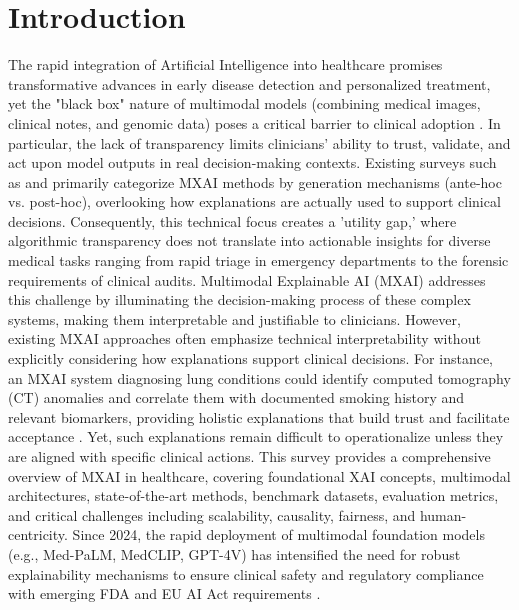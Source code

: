 \documentclass[pdflatex,sn-mathphys-num]{sn-jnl}%
\theoremstyle{thmstyleone}%
\theoremstyle{thmstyletwo}%
\theoremstyle{thmstylethree}%
\begin{document}
\keywords{
Multimodal Explainable AI, Clinical Decision Support, Action-Centered Explainability, Causal Inference }


\maketitle

\section{Introduction}\label{sec1}

The rapid integration of Artificial Intelligence into healthcare promises transformative advances in early disease detection and personalized treatment, yet the "black box" nature of multimodal models (combining medical images, clinical notes, and genomic data) poses a critical barrier to clinical adoption \cite{article}. In particular, the lack of transparency limits clinicians' ability to trust, validate, and act upon model outputs in real decision-making contexts.
Existing surveys such as \cite{rodis2024multimodalexplainableartificialintelligence} and \cite{SADEGHI2024109370} primarily categorize MXAI methods by generation mechanisms (ante-hoc vs. post-hoc), overlooking how explanations are actually used to support clinical decisions. Consequently, this technical focus creates a 'utility gap,' where algorithmic transparency does not translate into actionable insights for diverse medical tasks ranging from rapid triage in emergency departments to the forensic requirements of clinical audits.
Multimodal Explainable AI (MXAI) addresses this challenge by illuminating the decision-making process of these complex systems, making them interpretable and justifiable to clinicians. 
However, existing MXAI approaches often emphasize technical interpretability without explicitly considering how explanations support clinical decisions.
For instance, an MXAI system diagnosing lung conditions could identify computed tomography (CT) anomalies and correlate them with documented smoking history and relevant biomarkers, providing holistic explanations that build trust and facilitate acceptance \cite{Gaube2023,Niu2025}. 
Yet, such explanations remain difficult to operationalize unless they are aligned with specific clinical actions.
This survey provides a comprehensive overview of MXAI in healthcare, covering foundational XAI concepts, multimodal architectures, state-of-the-art methods, benchmark datasets, evaluation metrics, and critical challenges including scalability, causality, fairness, and human-centricity. Since 2024, the rapid deployment of multimodal foundation models (e.g., Med-PaLM, MedCLIP, GPT-4V) has intensified the need for robust explainability mechanisms to ensure clinical safety and regulatory compliance with emerging FDA and EU AI Act requirements \cite{wang2022medclipcontrastivelearningunpaired,liu2023holisticevaluationgpt4vbiomedical,fda2025draft,VANKOLFSCHOOTEN2024105152}. 
\end{document}
